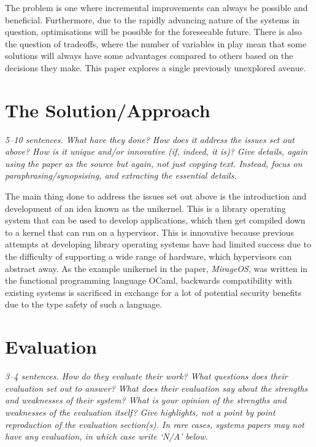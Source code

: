 \documentclass[11pt]{article}
\begin{document}
The problem is one where incremental improvements can always be possible and
beneficial. Furthermore, due to the rapidly advancing nature of the systems in
question, optimisations will be possible for the foreseeable future. There is
also the question of tradeoffs, where the number of variables in play mean that
some solutions will always have some advantages compared to others based on the
decisions they make. This paper explores a single previously unexplored
avenue.


\section*{The Solution/Approach}

\textsl{5--10 sentences. What have they done? How does it address the issues
set out above? How is it unique and/or innovative (if, indeed, it is)? Give
details, again using the paper as the source but again, not just copying text.
Instead, focus on paraphrasing/synopsising, and extracting the essential
details.} %

The main thing done to address the issues set out above is the introduction and
development of an idea known as the unikernel. This is a library operating
system that can be used to develop applications, which then get compiled down
to a kernel that can run on a hypervisor. This is innovative because previous
attempts at developing library operating systems have had limited success due
to the difficulty of supporting a wide range of hardware, which hypervisors can
abstract away. As the example unikernel in the paper, \textit{MirageOS}, was
written in the functional programming language OCaml, backwards compatibility
with existing systems is sacrificed in exchange for a lot of potential security
benefits due to the type safety of such a language.


\section*{Evaluation}

\textsl{3--4 sentences. How do they evaluate their work? What questions does
their evaluation set out to answer? What does their evaluation say about the
strengths and weaknesses of their system? What is your opinion of the strengths
and weaknesses of the evaluation itself? Give highlights, not a point by point
reproduction of the evaluation section(s). In rare cases, systems papers may
not have any evaluation, in which case write `N/A' below.}
\end{document}

